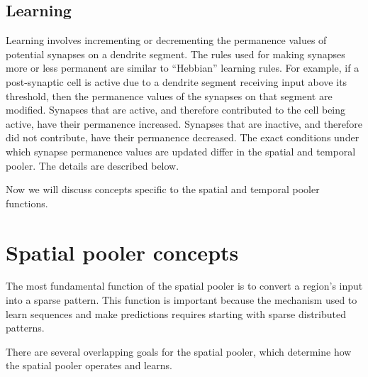 \documentclass{report}
\begin{document}
\subsection*{Learning}
Learning involves incrementing or decrementing the permanence values
of potential synapses on a dendrite segment. The rules used for making
synapses more or less permanent are similar to ``Hebbian'' learning
rules. For example, if a post-synaptic cell is active due to a
dendrite segment receiving input above its threshold, then the
permanence values of the synapses on that segment are
modified. Synapses that are active, and therefore contributed to the
cell being active, have their permanence increased. Synapses that are
inactive, and therefore did not contribute, have their permanence
decreased. The exact conditions under which synapse permanence values
are updated differ in the spatial and temporal pooler. The details are
described below.

Now we will discuss concepts specific to the spatial and temporal
pooler functions.

\section*{Spatial pooler concepts}

The most fundamental function of the spatial pooler is to convert a
region's input into a sparse pattern. This function is important
because the mechanism used to learn sequences and make predictions
requires starting with sparse distributed patterns.

There are several overlapping goals for the spatial pooler, which
determine how the spatial pooler operates and learns.
\end{document}
